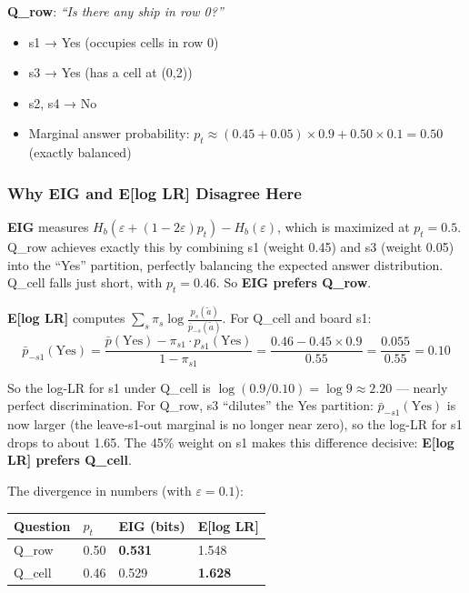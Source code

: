 \documentclass[
]{article}
\providecommand{\tightlist}{%
  \setlength{\itemsep}{0pt}\setlength{\parskip}{0pt}}
\begin{document}
\textbf{Q\_row}: \emph{``Is there any ship in row 0?''}

\begin{itemize}
\tightlist
\item
  s1 → Yes (occupies cells in row 0)
\item
  s3 → Yes (has a cell at (0,2))
\item
  s2, s4 → No
\item
  Marginal answer probability:
  \(p_t \approx (0.45 + 0.05) \times 0.9 + 0.50 \times 0.1 = 0.50\)
  (exactly balanced)
\end{itemize}

\subsubsection{Why EIG and E{[}log LR{]} Disagree
Here}\label{why-eig-and-elog-lr-disagree-here}

\textbf{EIG} measures
\(H_b(\varepsilon + (1-2\varepsilon)p_t) - H_b(\varepsilon)\), which is
maximized at \(p_t = 0.5\). Q\_row achieves exactly this by combining s1
(weight 0.45) and s3 (weight 0.05) into the ``Yes'' partition, perfectly
balancing the expected answer distribution. Q\_cell falls just short,
with \(p_t = 0.46\). So \textbf{EIG prefers Q\_row}.

\textbf{E{[}log LR{]}} computes
\(\sum_s \pi_s \log \frac{p_s(\tilde{a})}{\bar{p}_{-s}(\tilde{a})}\).
For Q\_cell and board s1:
\[\bar{p}_{-s1}(\text{Yes}) = \frac{\bar{p}(\text{Yes}) - \pi_{s1} \cdot p_{s1}(\text{Yes})}{1 - \pi_{s1}} = \frac{0.46 - 0.45 \times 0.9}{0.55} = \frac{0.055}{0.55} = 0.10\]

So the log-LR for s1 under Q\_cell is
\(\log(0.9/0.10) = \log 9 \approx 2.20\) --- nearly perfect
discrimination. For Q\_row, s3 ``dilutes'' the Yes partition:
\(\bar{p}_{-s1}(\text{Yes})\) is now larger (the leave-s1-out marginal
is no longer near zero), so the log-LR for s1 drops to about 1.65. The
45\% weight on s1 makes this difference decisive: \textbf{E{[}log LR{]}
prefers Q\_cell}.

The divergence in numbers (with \(\varepsilon = 0.1\)):

\begin{longtable}[]{@{}llll@{}}
\toprule\noalign{}
Question & \(p_t\) & EIG (bits) & E{[}log LR{]} \\
\midrule\noalign{}
\endhead
\bottomrule\noalign{}
\endlastfoot
Q\_row & 0.50 & \textbf{0.531} & 1.548 \\
Q\_cell & 0.46 & 0.529 & \textbf{1.628} \\
\end{longtable}
\end{document}
